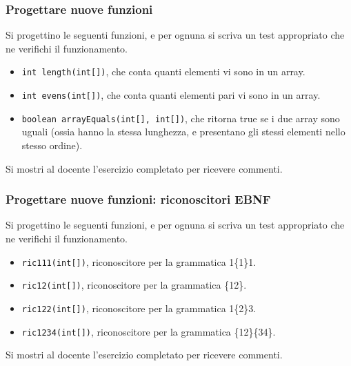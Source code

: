 \documentclass{beamer}
\begin{document}
\begin{frame}[fragile]
\frametitle{Progettare nuove funzioni}
Si progettino le seguenti funzioni, e per ognuna si scriva un test appropriato che ne verifichi il funzionamento.
\begin{itemize}
 \item \texttt{int length(int[])}, che conta quanti elementi vi sono in un array.
 \item \texttt{int evens(int[])}, che conta quanti elementi pari vi sono in un array.
 \item \texttt{boolean arrayEquals(int[], int[])}, che ritorna true se i due array sono uguali (ossia hanno la stessa lunghezza, e presentano gli stessi elementi nello stesso ordine).
\end{itemize}
Si mostri al docente l'esercizio completato per ricevere commenti.
\end{frame}

\begin{frame}[fragile]
\frametitle{Progettare nuove funzioni: riconoscitori EBNF}
Si progettino le seguenti funzioni, e per ognuna si scriva un test appropriato che ne verifichi il funzionamento.
\begin{itemize}
 \item \texttt{ric111(int[])}, riconoscitore per la grammatica 1\{1\}1.
 \item \texttt{ric12(int[])}, riconoscitore per la grammatica \{1\textbar{}2\}.
 \item \texttt{ric122(int[])}, riconoscitore per la grammatica 1\{2\}3.
 \item \texttt{ric1234(int[])}, riconoscitore per la grammatica \{1\textbar{}2\}\{3\textbar{}4\}.
\end{itemize}
Si mostri al docente l'esercizio completato per ricevere commenti.
\end{frame}

\end{document}

